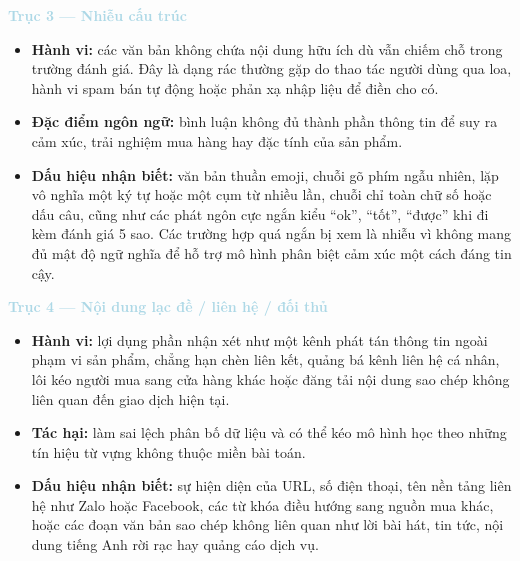 \vspace{0.5em}
\noindent\textcolor{lightblue}{\textbf{Trục 3 --- Nhiễu cấu trúc}}\par
\vspace{0.5em}

\begin{itemize}[labelsep=10pt, leftmargin=2cm]
    \item \textbf{Hành vi:} các văn bản không chứa nội dung hữu ích dù vẫn chiếm chỗ trong trường đánh giá. Đây là dạng rác thường gặp do thao tác người dùng qua loa, hành vi spam bán tự động hoặc phản xạ nhập liệu để điền cho có.
    \item \textbf{Đặc điểm ngôn ngữ:} bình luận không đủ thành phần thông tin để suy ra cảm xúc, trải nghiệm mua hàng hay đặc tính của sản phẩm.
    \item \textbf{Dấu hiệu nhận biết:} văn bản thuần emoji, chuỗi gõ phím ngẫu nhiên, lặp vô nghĩa một ký tự hoặc một cụm từ nhiều lần, chuỗi chỉ toàn chữ số hoặc dấu câu, cũng như các phát ngôn cực ngắn kiểu ``ok'', ``tốt'', ``được'' khi đi kèm đánh giá 5 sao. Các trường hợp quá ngắn bị xem là nhiễu vì không mang đủ mật độ ngữ nghĩa để hỗ trợ mô hình phân biệt cảm xúc một cách đáng tin cậy.
\end{itemize}

\vspace{0.5em}
\noindent\textcolor{lightblue}{\textbf{Trục 4 --- Nội dung lạc đề / liên hệ / đối thủ}}\par
\vspace{0.5em}

\begin{itemize}[labelsep=10pt, leftmargin=2cm]
    \item \textbf{Hành vi:} lợi dụng phần nhận xét như một kênh phát tán thông tin ngoài phạm vi sản phẩm, chẳng hạn chèn liên kết, quảng bá kênh liên hệ cá nhân, lôi kéo người mua sang cửa hàng khác hoặc đăng tải nội dung sao chép không liên quan đến giao dịch hiện tại.
    \item \textbf{Tác hại:} làm sai lệch phân bố dữ liệu và có thể kéo mô hình học theo những tín hiệu từ vựng không thuộc miền bài toán.
    \item \textbf{Dấu hiệu nhận biết:} sự hiện diện của URL, số điện thoại, tên nền tảng liên hệ như Zalo hoặc Facebook, các từ khóa điều hướng sang nguồn mua khác, hoặc các đoạn văn bản sao chép không liên quan như lời bài hát, tin tức, nội dung tiếng Anh rời rạc hay quảng cáo dịch vụ.
\end{itemize}

